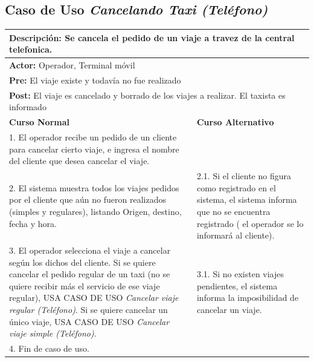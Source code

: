 \documentclass[a4paper]{article}
\begin{document}
\subsection{Caso de Uso \textit{Cancelando Taxi (Tel\'efono)}}
\begin{center}
\begin{tabular}{|p{10cm} | p{6cm}|}
\hline
\multicolumn{2}{|p{15cm}|}{\textbf{Descripci\'on:} Se cancela el pedido de un viaje a travez de la central telefonica.} \\
\hline
\multicolumn{2}{|p{15cm}|}{\textbf{Actor:} Operador, Terminal m\'ovil} \\
\hline
\multicolumn{2}{|p{15cm}|}{\textbf{Pre:} El viaje existe y todav\'ia no fue realizado} \\
\hline
\multicolumn{2}{|p{15cm}|}{\textbf{Post:} El viaje es cancelado y borrado de los viajes a realizar. El taxista es informado}\\
\hline
\textbf{Curso Normal}  & \textbf{Curso Alternativo} \\ \hline
1. El operador recibe un pedido de un cliente para cancelar cierto viaje, e ingresa el nombre del cliente que desea cancelar el viaje. & \\ \hline
2. El sistema muestra todos los viajes pedidos por el cliente que a\'un no fueron realizados (simples y regulares), listando Origen, destino, fecha y hora. & 2.1. Si el cliente no figura como registrado en el sistema, el sistema informa que no se encuentra registrado ( el operador se lo informar\'a al cliente). \\ \hline
3. El operador selecciona el viaje a cancelar seg\'un los dichos del cliente. Si se quiere cancelar el pedido regular de un taxi (no se quiere recibir m\'as el servicio de ese viaje regular), USA CASO DE USO \textit{Cancelar viaje regular (Tel\'efono)}. \newline Si se quiere cancelar un \'unico viaje, USA CASO DE USO \textit{Cancelar viaje simple (Tel\'efono)}. & 3.1. Si no existen viajes pendientes, el sistema informa la imposibilidad de cancelar un viaje. \\ \hline %
4. Fin de caso de uso. & \\ \hline
\end{tabular}
\end{center}
\end{document}
